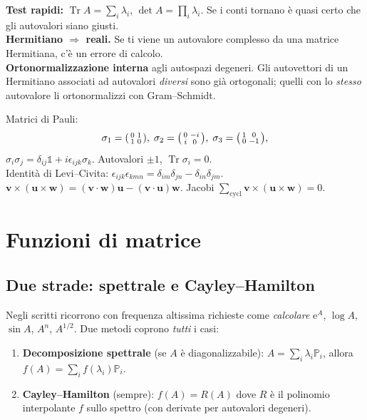 \documentclass[11pt,a4paper,openany]{book}
\theoremstyle{definition}
\newcommand{\eu}{\mathrm{e}}
\DeclareMathOperator{\Tr}{Tr}
\begin{document}
\begin{trucco}
\textbf{Test rapidi:} $\Tr A=\sum_i\lambda_i$, $\det A=\prod_i\lambda_i$. Se i conti tornano \`e quasi certo che gli autovalori siano giusti.\\
\textbf{Hermitiano $\Rightarrow$ reali.} Se ti viene un autovalore complesso da una matrice Hermitiana, c'\`e un errore di calcolo.\\
\textbf{Ortonormalizzazione interna} agli autospazi degeneri. Gli autovettori di un Hermitiano associati ad autovalori \emph{diversi} sono gi\`a ortogonali; quelli con lo \emph{stesso} autovalore li ortonormalizzi con Gram--Schmidt.
\end{trucco}

\begin{formulario}
Matrici di Pauli:
$$\sigma_1=\begin{psmallmatrix}0&1\\1&0\end{psmallmatrix},\;\sigma_2=\begin{psmallmatrix}0&-i\\i&0\end{psmallmatrix},\;\sigma_3=\begin{psmallmatrix}1&0\\0&-1\end{psmallmatrix},$$
$\sigma_i\sigma_j=\delta_{ij}\mathbb 1+i\epsilon_{ijk}\sigma_k$. Autovalori $\pm 1$, $\Tr\sigma_i=0$.\\
Identit\`a di Levi--Civita: $\epsilon_{ijk}\epsilon_{kmn}=\delta_{im}\delta_{jn}-\delta_{in}\delta_{jm}$.\\
$\bm v\times(\bm u\times\bm w)=(\bm v\cdot\bm w)\bm u-(\bm v\cdot\bm u)\bm w$. Jacobi $\sum_{\text{cycl}}\bm v\times(\bm u\times\bm w)=0$.
\end{formulario}

\chapter{Funzioni di matrice}\label{ch:fun-matrice}

\section{Due strade: spettrale e Cayley--Hamilton}
Negli scritti ricorrono con frequenza altissima richieste come \emph{calcolare} $\eu^{A}$, $\log A$, $\sin A$, $A^{n}$, $A^{1/2}$. Due metodi coprono \emph{tutti} i casi:
\begin{enumerate}
\item \textbf{Decomposizione spettrale} (se $A$ \`e diagonalizzabile): $A=\sum_i \lambda_i\mathbb P_i$, allora $f(A)=\sum_i f(\lambda_i)\mathbb P_i$.
\item \textbf{Cayley--Hamilton} (sempre): $f(A)=R(A)$ dove $R$ \`e il polinomio interpolante $f$ sullo spettro (con derivate per autovalori degeneri).
\end{enumerate}
\end{document}
